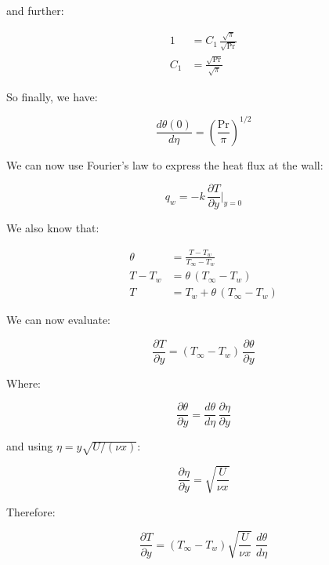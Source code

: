 \documentclass[letterpaper,12pt]{article}
\begin{document}
and further:

\begin{equation}
\begin{aligned}
    1   &= C_1\,\frac{\sqrt{\pi}}{\sqrt{\text{Pr}}} \\
    C_1 &= \frac{\sqrt{\text{Pr}}}{\sqrt{\pi}}
\end{aligned}
\end{equation}

So finally, we have:

\begin{equation}
\boxed{
    \frac{d\theta(0)}{d\eta}=\left(\frac{\text{Pr}}{\pi}\right)^{1/2}
}
\end{equation}

We can now use Fourier's law to express the heat flux at the wall:

\begin{equation}
    q_w=-k\,\frac{\partial T}{\partial y}\bigg|_{y=0}
\end{equation}

We also know that:

\begin{equation}
\begin{aligned}
    \theta &= \frac{T-T_w}{T_\infty-T_w} \\
    T-T_w  &= \theta\,(T_\infty-T_w) \\
    T      &= T_w+\theta\,(T_\infty-T_w)
\end{aligned}
\end{equation}

We can now evaluate:

\begin{equation}
    \frac{\partial T}{\partial y}=(T_\infty-T_w)\,\frac{\partial\theta}{\partial y}
\end{equation}

Where:

\begin{equation}
    \frac{\partial\theta}{\partial y}=\frac{d\theta}{d\eta}\,\frac{\partial\eta}{\partial y}
\end{equation}

and using $\eta=y\sqrt{U/(\nu x)}$:

\begin{equation}
    \frac{\partial\eta}{\partial y}=\sqrt{\frac{U}{\nu x}}
\end{equation}

Therefore:

\begin{equation}
    \frac{\partial T}{\partial y}=(T_\infty-T_w)\sqrt{\frac{U}{\nu x}}\;\frac{d\theta}{d\eta}
\end{equation}
\end{document}
